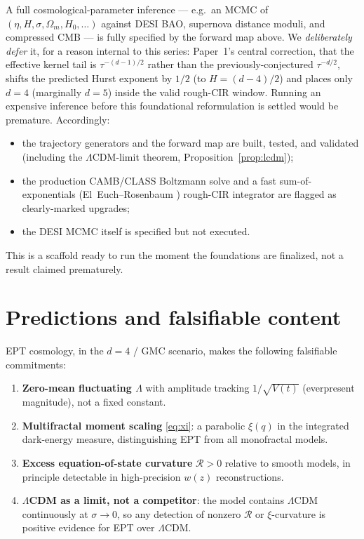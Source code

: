 \documentclass[11pt,a4paper]{article}
\begin{document}
A full cosmological-parameter inference --- e.g.\ an MCMC of $(\eta,H,\sigma,\Omega_m,H_0,\dots)$ against DESI BAO, supernova distance moduli, and compressed CMB --- is fully specified by the forward map above. We \emph{deliberately defer} it, for a reason internal to this series: Paper~1's central correction, that the effective kernel tail is $\tau^{-(d-1)/2}$ rather than the previously-conjectured $\tau^{-d/2}$, shifts the predicted Hurst exponent by $1/2$ (to $H=(d-4)/2$) and places only $d=4$ (marginally $d=5$) inside the valid rough-CIR window. Running an expensive inference before this foundational reformulation is settled would be premature. Accordingly:
\begin{itemize}
\item the trajectory generators and the forward map are built, tested, and validated (including the $\Lambda$CDM-limit theorem, Proposition~\ref{prop:lcdm});
\item the production CAMB/CLASS Boltzmann solve and a fast sum-of-exponentials (El~Euch--Rosenbaum \cite{ElEuchRosenbaum2018}) rough-CIR integrator are flagged as clearly-marked upgrades;
\item the DESI MCMC itself is specified but not executed.
\end{itemize}
This is a scaffold ready to run the moment the foundations are finalized, not a result claimed prematurely.

\section{Predictions and falsifiable content}

EPT cosmology, in the $d=4$ / GMC scenario, makes the following falsifiable commitments:
\begin{enumerate}
\item \textbf{Zero-mean fluctuating $\Lambda$} with amplitude tracking $1/\sqrt{V(t)}$ (everpresent magnitude), not a fixed constant.
\item \textbf{Multifractal moment scaling} \eqref{eq:xi}: a parabolic $\xi(q)$ in the integrated dark-energy measure, distinguishing EPT from all monofractal models.
\item \textbf{Excess equation-of-state curvature} $\mathcal{R}>0$ relative to smooth models, in principle detectable in high-precision $w(z)$ reconstructions.
\item \textbf{$\Lambda$CDM as a limit, not a competitor}: the model contains $\Lambda$CDM continuously at $\sigma\to0$, so any detection of nonzero $\mathcal{R}$ or $\xi$-curvature is positive evidence for EPT over $\Lambda$CDM.
\end{enumerate}
\end{document}
